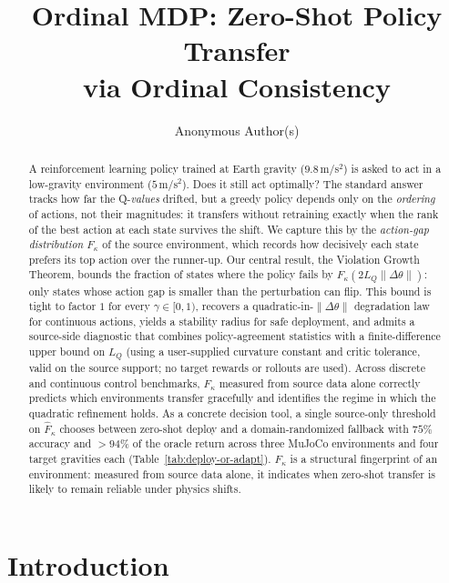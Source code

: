 \documentclass{article}
\title{Ordinal MDP: Zero-Shot Policy Transfer \\ via Ordinal Consistency}
\author{Anonymous Author(s)}
\begin{document}
\maketitle

\begin{abstract}
A reinforcement learning policy trained at Earth gravity ($9.8$\,m/s$^2$) is asked to act in a low-gravity environment ($5$\,m/s$^2$). Does it still act optimally? The standard answer tracks how far the Q-\emph{values} drifted, but a greedy policy depends only on the \emph{ordering} of actions, not their magnitudes: it transfers without retraining exactly when the rank of the best action at each state survives the shift. We capture this by the \emph{action-gap distribution} $F_\kappa$ of the source environment, which records how decisively each state prefers its top action over the runner-up. Our central result, the Violation Growth Theorem, bounds the fraction of states where the policy fails by $F_\kappa(2 L_Q \|\Delta\theta\|)$: only states whose action gap is smaller than the perturbation can flip. This bound is tight to factor $1$ for every $\gamma \in [0,1)$, recovers a quadratic-in-$\|\Delta\theta\|$ degradation law for continuous actions, yields a stability radius for safe deployment, and admits a source-side diagnostic that combines policy-agreement statistics with a finite-difference upper bound on $L_Q$ (using a user-supplied curvature constant and critic tolerance, valid on the source support; no target rewards or rollouts are used). Across discrete and continuous control benchmarks, $F_\kappa$ measured from source data alone correctly predicts which environments transfer gracefully and identifies the regime in which the quadratic refinement holds. As a concrete decision tool, a single source-only threshold on $\hat F_\kappa$ chooses between zero-shot deploy and a domain-randomized fallback with $75\%$ accuracy and $>94\%$ of the oracle return across three MuJoCo environments and four target gravities each (Table~\ref{tab:deploy-or-adapt}). $F_\kappa$ is a structural fingerprint of an environment: measured from source data alone, it indicates when zero-shot transfer is likely to remain reliable under physics shifts.
\end{abstract}

\section{Introduction}
\label{sec:intro}
\end{document}
